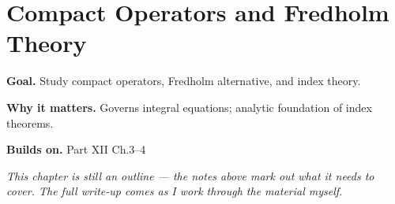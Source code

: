 \chapter{Compact Operators and Fredholm Theory}
\label{ch:12-functional-analysis-and-spectral-theory-05}

\begin{chapterintro}
\textbf{Goal.} Study compact operators, Fredholm alternative, and index theory.

\textbf{Why it matters.} Governs integral equations; analytic foundation of index theorems.

\textbf{Builds on.} Part XII Ch.3–4
\end{chapterintro}

\textit{This chapter is still an outline --- the notes above mark out what it needs to cover. The full write-up comes as I work through the material myself.}
